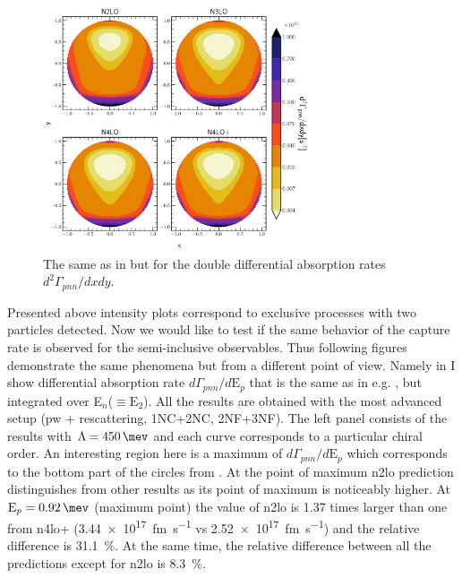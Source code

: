    \begin{figure}[h]
        \begin{center}
        \includegraphics[width=0.7\textwidth]{PlotData/PION/Dalitz_maps/figures/Dalitz_map_pnn_xy_orders.pdf}
        \end{center}
        \caption{The same as in  but for the double differential absorption rates
        $d^2 \Gamma_{pnn}/dxdy$.}
        \label{pion_map_xy_order}
    \end{figure}

    
    Presented above intensity plots correspond to exclusive processes with two particles detected.
    Now we would like to test if the same behavior of the capture rate is observed for
    the semi-inclusive observables.
    Thus following figures demonstrate the same phenomena but from a different point of view.
    Namely in  I show differential absorption rate $d\Gamma_{pnn} /d\text{E}_p$
    that is the same as in e.g. , but integrated over E$_n$($\equiv\text{E}_2$).
    All the results are obtained with the most advanced setup (\gls{pw} + rescattering, 1NC+2NC, 2NF+3NF).
    The left panel consists of the results with $\Lambda=\SI{450}{\mev}$ and each curve corresponds 
    to a particular chiral order. An interesting region here is a maximum
    of $d\Gamma_{pnn} /d\text{E}_p$  which corresponds
    to the bottom part of the circles from . At the point of maximum
    \gls{n2lo} prediction distinguishes from other results as its point of maximum is noticeably higher.
    At $\text{E}_p = \SI{0.92}{\mev}$ (maximum point) the value of \gls{n2lo} is
    \num{1.37} times larger than one from \gls{n4lo+} (\SI{3.44e+17}{fm.\s^{-1}}
    vs \SI{2.52e+17}{fm.\s^{-1}}) and the relative difference is \SI{31.1}{\percent}.
    At the same time, the relative difference between all the predictions except for \gls{n2lo}
    is \SI{8.3}{\percent}.


